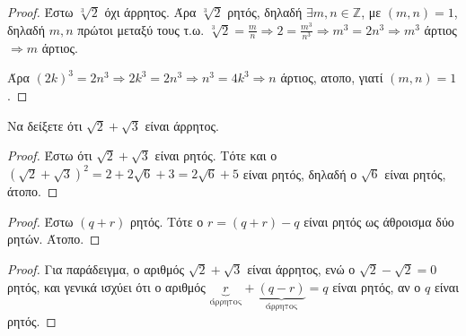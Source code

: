 \documentclass[main.tex]{subfiles}
\begin{document}
\begin{proof}
  Έστω $ \sqrt[3]{2} $ όχι άρρητος. Άρα $ \sqrt[3]{2} $ ρητός, δηλαδή $ \exists m,n 
  \in \mathbb{Z} $, με $ (m,n)=1 $, δηλαδή $ m,n $ πρώτοι μεταξύ τους
  τ.ω. $ \sqrt[3]{2} = \frac{m}{n} \Rightarrow 2 = \frac{m^{3}}{n^{3}} \Rightarrow 
  m^{3} = 2n^{3} \Rightarrow m^{3} $ άρτιος $ \Rightarrow m $ άρτιος. 

  Άρα $ (2k)^{3} = 2n^{3} \Rightarrow 2k^{3}=2n^{3} \Rightarrow n^{3} = 4k^{3} 
  \Rightarrow n $ άρτιος,  ατοπο, γιατί $ (m,n)=1 $.
\end{proof}

\begin{example}
  Να δείξετε ότι $ \sqrt{2} + \sqrt{3} $ είναι άρρητος.
\end{example}

\begin{proof}
  Έστω ότι $ \sqrt{2} + \sqrt{3} $ είναι ρητός. Τότε και ο $ (\sqrt{2} + \sqrt{3} )
  ^{2} = 2 + 2 \sqrt{6} + 3 = 2 \sqrt{6} + 5 $ είναι ρητός, δηλαδή ο $ \sqrt{6} $ 
  είναι ρητός, άτοπο.
\end{proof}


\begin{proof}
\item {}
  Έστω $(q+r)$ ρητός. Τότε ο $ r = (q+r)-q $ είναι ρητός ως άθροισμα δύο 
  ρητών. Άτοπο.
\end{proof}


\begin{proof}
  Για παράδειγμα, ο αριθμός $ \sqrt{2} + \sqrt{3} $ είναι άρρητος, ενώ ο 
  $ \sqrt{2} - \sqrt{2} = 0 $ ρητός, και γενικά ισχύει ότι ο αριθμός
  $ \underbrace{r}_{\text{άρρητος}}+ \underbrace{(q-r)}_{\text{άρρητος}} =q $ 
  είναι ρητός, αν ο $q$ είναι ρητός.
\end{proof}

\end{document}
